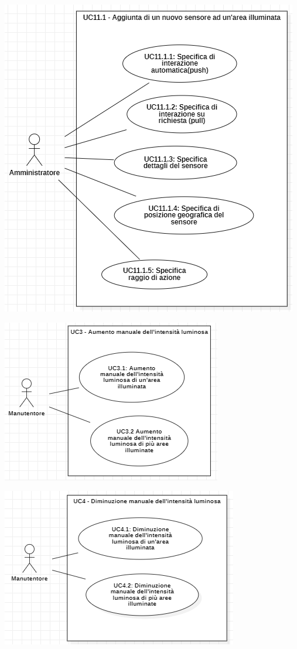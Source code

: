 \documentclass[a4paper, 12pt]{article}
\begin{document}
\includegraphics[scale=0.7]{diagramma_use_case_5.png}

\includegraphics[scale=0.60]{diagramma_use_case_6.png}

\includegraphics[scale=0.7]{diagramma_use_case_7.png}
\end{document}
